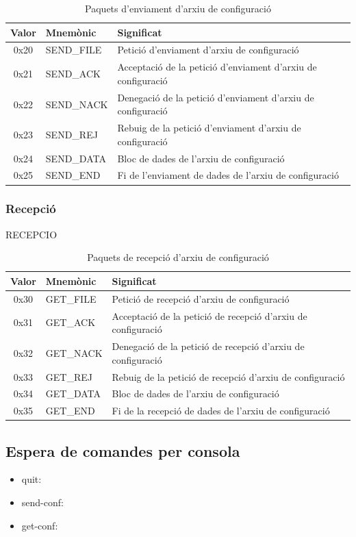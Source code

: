 \documentclass[11pt]{article}
\begin{document}
\begin{table}[h]
\centering
\def\arraystretch{1.5}
\begin{tabular}{ c l l }
\hline
Valor & Mnemònic & Significat\\
\hline
\hline
0x20 & SEND\_FILE & Petició d’enviament d’arxiu de configuració\\
0x21 & SEND\_ACK & Acceptació de la petició d’enviament d’arxiu de configuració \\
0x22 & SEND\_NACK & Denegació de la petició d’enviament d’arxiu de configuració\\
0x23 & SEND\_REJ & Rebuig de la petició d’enviament d’arxiu de configuració\\
0x24 & SEND\_DATA & Bloc de dades de l’arxiu de configuració\\
0x25 & SEND\_END & Fi de l’enviament de dades de l’arxiu de configuració\\
\hline
	\end{tabular}
	\caption{Paquets d'enviament d'arxiu de configuració }
	\label{tab:PaquetsEnviament}
\end{table}

	\subsubsection*{Recepció}
RECEPCIO
\begin{table}[h]
\centering
\def\arraystretch{1.5}
\begin{tabular}{ c l l }
\hline
Valor & Mnemònic & Significat\\
\hline
\hline
0x30 & GET\_FILE & Petició de recepció d’arxiu de configuració\\
0x31 & GET\_ACK & Acceptació de la petició de recepció d’arxiu de configuració \\
0x32 & GET\_NACK & Denegació de la petició de recepció d’arxiu de configuració\\
0x33 & GET\_REJ & Rebuig de la petició de recepció d’arxiu de configuració\\
0x34 & GET\_DATA & Bloc de dades de l’arxiu de configuració\\
0x35 & GET\_END & Fi de la recepció de dades de l’arxiu de configuració\\
\hline
	\end{tabular}
	\caption{Paquets de recepció d'arxiu de configuració }
	\label{tab:PaquetsRecepcio}
\end{table}
	\subsection{Espera de comandes per consola}
\begin{itemize}
\item quit:
\item send-conf:
\item get-conf:
\end{itemize}
\end{document}
